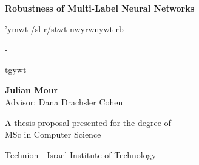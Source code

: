 
\begin{titlepage}
   \begin{center}

       \huge
       \textbf{Robustness of Multi-Label Neural Networks}

       \vspace*{1cm}


       \begin{cjhebrew} 'ymwt /sl r/stwt nwyrwnywt rb\end{cjhebrew}-\begin{cjhebrew}tgywt\end{cjhebrew}




%

       \vspace{2.5cm}

        \Large
        \textbf{Julian Mour} \\
        
        Advisor: Dana Drachsler Cohen\\


       \vfill

       A thesis proposal presented for the degree of\\
       MSc in Computer Science

       \vspace{0.8cm}


       Technion - Israel Institute of Technology\\

   \end{center}
\end{titlepage} 